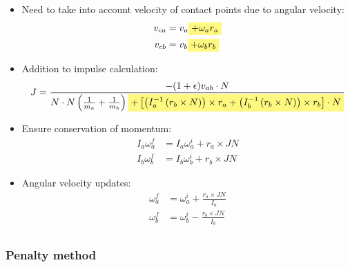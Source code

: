 \documentclass[a4paper]{article}
\newcommand{\hl}[1]{\colorbox{yellow!50}{$\displaystyle#1$}}
\begin{document}

\begin{itemize}
  \item
    Need to take into account velocity of contact points due to angular
    velocity:
    \begin{align*}
      v_{ca} &= v_{a} \hl{+ \omega_{a} r_{a}} \\
      v_{cb} &= v_{b} \hl{+ \omega_{b} r_{b}}
    \end{align*}

  \item
    Addition to impulse calculation:
    \[
      J = \frac{-(1 + \epsilon) v_{ab} \cdot N}
               {N \cdot N\left(\frac{1}{m_{a}} + \frac{1}{m_{b}}\right)
                \hl{+ \left[
                      \left(I_{a}^{-1} \left(r_{b} \times N\right)\right) \times r_{a} +
                      \left(I_{b}^{-1} \left(r_{b} \times N\right)\right) \times r_{b}
                      \right] \cdot N
                   }
               }
    \]

  \item
    Ensure conservation of momentum:
    \begin{align*}
      I_{a} \omega_{a}^{f} &= I_{a} \omega_{a}^{i} + r_{a} \times J N \\
      I_{b} \omega_{b}^{f} &= I_{b} \omega_{b}^{i} + r_{b} \times J N
    \end{align*}

  \item
    Angular velocity updates:
    \begin{align*}
      \omega_{a}^{f} &= \omega_{a}^{i} + \frac{r_{a} \times J N}{I_{a}} \\
      \omega_{b}^{f} &= \omega_{b}^{i} - \frac{r_{b} \times J N}{I_{b}} \\
    \end{align*}

\end{itemize}

\subsubsection{Penalty method}
\end{document}

